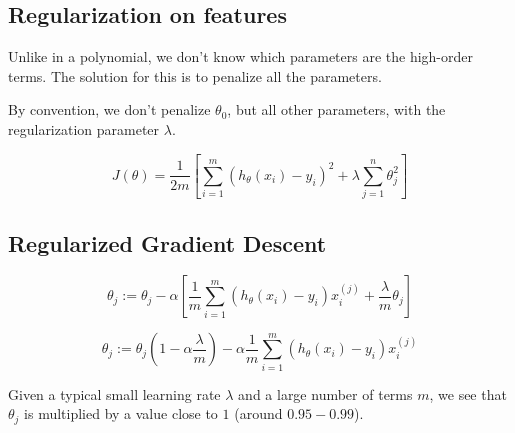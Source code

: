 \subsection{Regularization on features}
Unlike in a polynomial, we don't know which parameters are the high-order terms. The solution for this is to penalize all the parameters.

By convention, we don't penalize $\theta_0$, but all other parameters, with the regularization parameter $\lambda$.

\[
    J(\theta) = \frac{1}{2m}\left[\sum_{i=1}^{m}\left(h_{\theta}(x_i)-y_i\right)^2 + \lambda\sum_{j=1}^{n}\theta_j^2\right]
\]

\subsection{Regularized Gradient Descent}
\[
    \theta_j := \theta_j - \alpha\left[\frac{1}{m}\sum_{i=1}^{m}\left(h_{\theta}(x_i)-y_i\right)x_i^{(j)} + \frac{\lambda}{m}\theta_j\right]
\]

\[
    \theta_j := \theta_j\left(1-\alpha\frac{\lambda}{m}\right) - \alpha\frac{1}{m}\sum_{i=1}^{m}\left(h_{\theta}(x_i)-y_i\right)x_i^{(j)}
\]

Given a typical small learning rate $\lambda$ and a large number of terms $m$, we see that $\theta_j$ is multiplied by a value close to $1$ (around $0.95-0.99$).
